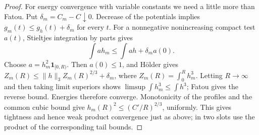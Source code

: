 \documentclass[11pt]{article}
\begin{document}
\begin{proof}
For energy convergence with variable constants we need a little more
than Fatou. Put $\delta_m=C_m-C\downarrow0$. Decrease of the potentials
implies $g_m(t)\leq g_h(t)+\delta_m$ for every $t$. For a nonnegative
nonincreasing compact test $a(t)$, Stieltjes integration by parts gives
\[
 \int a h_m\leq\int a h+\delta_m a(0).
\]
Choose $a=h_m^2\mathbf1_{[0,R)}$. Then $a(0)\leq1$, and H\"older gives
$Z_m(R)\leq\|h\|_3 Z_m(R)^{2/3}+\delta_m$, where
$Z_m(R)=\int_0^R h_m^3$. Letting $R\to\infty$ and then taking limit
superiors shows $\limsup\int h_m^3\leq\int h^3$; Fatou gives the reverse
bound. Energies therefore converge. Monotonicity of the profiles and
the common cubic bound give $h_m(R)^2\leq(C'/R)^{2/3}$, uniformly.
This gives tightness and hence weak product convergence just as above;
in two slots use the product of the corresponding tail bounds.
\end{proof}
\end{document}
